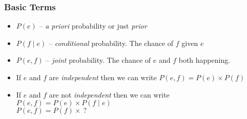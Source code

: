 %
%
%
%
%

\begin{frame}
\frametitle{Basic Terms}
\begin{itemize}[<+->]
\item $P(e)$ -- {\em a priori} probability or just {\em prior}
\item $P(f \mid e)$ -- {\em conditional} probability. The chance of
  $f$ given $e$
\item $P(e, f)$ -- {\em joint} probability. The chance of $e$ and $f$
  both happening.
\item If $e$ and $f$ are {\em independent} then we can write $P(e,f) =
  P(e) \times P(f)$
\item If $e$ and $f$ are not {\em independent} then we can write
  $P(e,f) = P(e) \times P(f \mid e)$ \\
 $P(e,f) = P(f) \times\ ?$
\end{itemize}

\end{frame}

